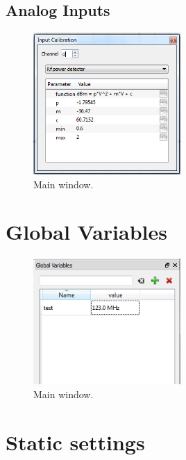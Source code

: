 \documentclass[11pt]{scrartcl}
\begin{document}
\subsection{Analog Inputs}
\begin{figure}[htbp]
\begin{center}
\includegraphics[width=0.5\textwidth]{AnalogInputCalibration}
\end{center}
\caption{\label{WavemeterInterlock} Main window.}
\end{figure}

\section{Global Variables}
\begin{figure}[htbp]
\begin{center}
\includegraphics[width=0.5\textwidth]{GlobalVariables}
\end{center}
\caption{\label{GlobalVariables} Main window.}
\end{figure}


\section{Static settings}
\end{document}
